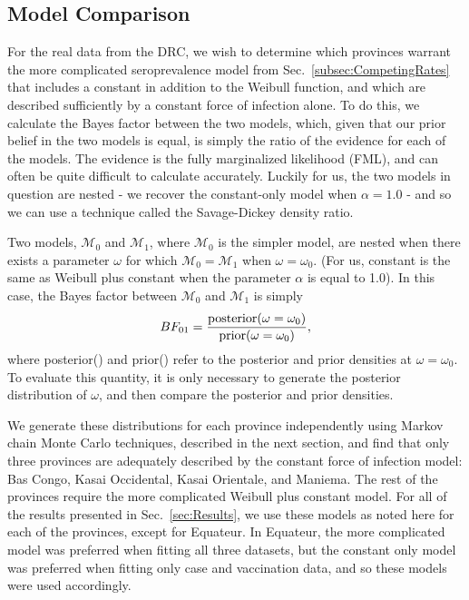 \documentclass[nofootinbib,aps,pre,twocolumn,superscriptaddress,showkeys,showpacs]{revtex4-1}
\begin{document}
\subsection{Model Comparison\label{subsec:BF}}
For the real data from the DRC, we wish to determine which provinces warrant the more complicated seroprevalence model from Sec.~\ref{subsec:CompetingRates} that includes a constant in addition to the Weibull function, and which are described sufficiently by a constant force of infection alone. To do this, we calculate the Bayes factor between the two models, which, given that our prior belief in the two models is equal, is simply the ratio of the evidence for each of the models. The evidence is the fully marginalized likelihood (FML), and can often be quite difficult to calculate accurately. Luckily for us, the two models in question are nested - we recover the constant-only model when $\alpha = 1.0$ -  and so we can use a technique called the Savage-Dickey density ratio.

Two models, $\mathcal{M}_0$ and $\mathcal{M}_1$, where $\mathcal{M}_0$ is the simpler model, are nested when there exists a parameter $\omega$ for which $\mathcal{M}_0 = \mathcal{M}_1$ when $\omega = \omega_0$. (For us, constant is the same as Weibull plus constant when the parameter $\alpha$ is equal to 1.0). In this case, the Bayes factor between $\mathcal{M}_0$ and $\mathcal{M}_1$ is simply
\begin{equation}
BF_{01} = \frac{\rm{posterior}(\omega =\omega_0)}{\rm{prior}(\omega=\omega_0)},
\end{equation}
where posterior() and prior() refer to the posterior and prior densities at $\omega = \omega_0$. To evaluate this quantity, it is only necessary to generate the posterior distribution of $\omega$, and then compare the posterior and prior densities.

We generate these distributions for each province independently using Markov chain Monte Carlo techniques, described in the next section, and find that only three provinces are adequately described by the constant force of infection model:  Bas Congo, Kasai Occidental, Kasai Orientale, and Maniema. The rest of the provinces require the more complicated Weibull plus constant model. For all of the results presented in Sec.~\ref{sec:Results}, we use these models as noted here for each of the provinces, except for Equateur. In Equateur, the more complicated model was preferred when fitting all three datasets, but the constant only model was preferred when fitting only case and vaccination data, and so these models were used accordingly.
\end{document}
